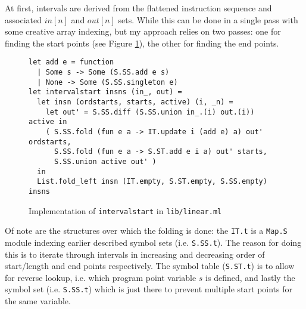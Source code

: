 \documentclass{article}
\begin{document}
At first, intervals are derived from the flattened instruction sequence and associated \(\mathit{in}[n]\) and \(\mathit{out}[n]\) sets. 
While this can be done in a single pass with some creative array indexing, but my approach relies on two passes: one for finding the start points (see Figure \ref{fig:livenessstarts.ml}), the other for finding the end points.

\begin{figure}[H]
  \centering
   \begin{minipage}[b]{0.88\textwidth}
     \centering
     \begin{verbatim}
let add e = function
  | Some s -> Some (S.SS.add e s)
  | None -> Some (S.SS.singleton e)
let intervalstart insns (in_, out) =
  let insn (ordstarts, starts, active) (i, _n) =
    let out' = S.SS.diff (S.SS.union in_.(i) out.(i)) active in
    ( S.SS.fold (fun e a -> IT.update i (add e) a) out' ordstarts,
      S.SS.fold (fun e a -> S.ST.add e i a) out' starts,
      S.SS.union active out' )
  in
  List.fold_left insn (IT.empty, S.ST.empty, S.SS.empty) insns
     \end{verbatim}
     \caption{Implementation of \texttt{intervalstart} in \texttt{lib/linear.ml}}\label{fig:livenessstarts.ml}
   \end{minipage}
\end{figure}

\noindent Of note are the structures over which the folding is done: the \texttt{IT.t} is a \texttt{Map.S} module indexing earlier described symbol sets (i.e. \texttt{S.SS.t}). The reason for doing this is to iterate through intervals in increasing and decreasing order of start/length and end points respectively. The symbol table (\texttt{S.ST.t}) is to allow for reverse lookup, i.e. which program point variable \(s\) is defined, and lastly the symbol set (i.e. \texttt{S.SS.t}) which is just there to prevent multiple start points for the same variable.
\end{document}
